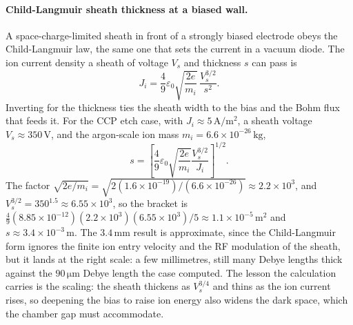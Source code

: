 \paragraph{Child-Langmuir sheath thickness at a biased wall.}
A space-charge-limited sheath in front of a strongly biased electrode obeys
the Child-Langmuir law, the same one that sets the current in a vacuum
diode. The ion current density a sheath of voltage $V_{s}$ and thickness $s$
can pass is
\[
J_{i} = \frac{4}{9}\varepsilon_{0}
\sqrt{\frac{2e}{m_{i}}}\,\frac{V_{s}^{3/2}}{s^{2}}.
\]
Inverting for the thickness ties the sheath width to the bias and the Bohm
flux that feeds it. For the CCP etch case, with $J_{i}\approx 5\,\si{\ampere
\per\meter\squared}$, a sheath voltage $V_{s}\approx 350\,\si{\volt}$, and
the argon-scale ion mass $m_{i} = 6.6\times 10^{-26}\,\si{\kilogram}$,
\[
s = \left[\frac{4}{9}\varepsilon_{0}\sqrt{\frac{2e}{m_{i}}}
\frac{V_{s}^{3/2}}{J_{i}}\right]^{1/2}.
\]
The factor $\sqrt{2e/m_{i}} = \sqrt{2(1.6\times 10^{-19})/(6.6\times
10^{-26})} \approx 2.2\times 10^{3}$, and $V_{s}^{3/2} = 350^{1.5} \approx
6.55\times 10^{3}$, so the bracket is $\tfrac49(8.85\times 10^{-12})(2.2
\times 10^{3})(6.55\times 10^{3})/5 \approx 1.1\times 10^{-5}\,\si{\meter
\squared}$ and $s \approx 3.4\times 10^{-3}\,\si{\meter}$. The
$3.4\,\si{\milli\meter}$ result is approximate, since the
Child-Langmuir form ignores the finite ion entry velocity and the RF
modulation of the sheath, but it lands at the right scale: a few millimetres,
still many Debye lengths thick against the $90\,\si{\micro\meter}$
Debye length the case computed. The lesson the calculation carries is the
scaling: the sheath thickens as $V_{s}^{3/4}$ and thins as the ion current
rises, so deepening the bias to raise ion energy also widens the dark space,
which the chamber gap must accommodate.

